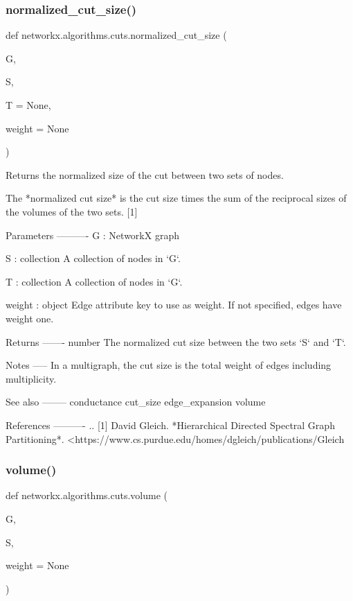 \begin{DoxyVerb}
\subsubsection{\texorpdfstring{normalized\+\_\+cut\+\_\+size()}{normalized\_cut\_size()}}
{\footnotesize\ttfamily def networkx.\+algorithms.\+cuts.\+normalized\+\_\+cut\+\_\+size (\begin{DoxyParamCaption}\item[{}]{G,  }\item[{}]{S,  }\item[{}]{T = {\ttfamily None},  }\item[{}]{weight = {\ttfamily None} }\end{DoxyParamCaption})}

\begin{DoxyVerb}Returns the normalized size of the cut between two sets of nodes.

The *normalized cut size* is the cut size times the sum of the
reciprocal sizes of the volumes of the two sets. [1]

Parameters
----------
G : NetworkX graph

S : collection
    A collection of nodes in `G`.

T : collection
    A collection of nodes in `G`.

weight : object
    Edge attribute key to use as weight. If not specified, edges
    have weight one.

Returns
-------
number
    The normalized cut size between the two sets `S` and `T`.

Notes
-----
In a multigraph, the cut size is the total weight of edges including
multiplicity.

See also
--------
conductance
cut_size
edge_expansion
volume

References
----------
.. [1] David Gleich.
       *Hierarchical Directed Spectral Graph Partitioning*.
       <https://www.cs.purdue.edu/homes/dgleich/publications/Gleich%
 \mbox{\label{namespacenetworkx_1_1algorithms_1_1cuts_aba099ec7dcd9a10ba04202443c4453f9}} 
\subsubsection{\texorpdfstring{volume()}{volume()}}
{\footnotesize\ttfamily def networkx.\+algorithms.\+cuts.\+volume (\begin{DoxyParamCaption}\item[{}]{G,  }\item[{}]{S,  }\item[{}]{weight = {\ttfamily None} }\end{DoxyParamCaption})}


\end{DoxyVerb}
\end{DoxyVerb}
